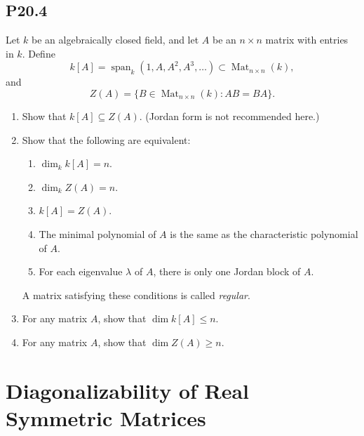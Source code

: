 \documentclass[lang=cn,11pt]{template}
\begin{document}
\subsection*{P20.4} Let \( k \) be an algebraically closed field, and let \( A \) be an \( n \times n \) matrix with entries in \( k \). Define
\[
k[A] = \operatorname{span}_k(1, A, A^2, A^3, \dots) \subset \operatorname{Mat}_{n \times n}(k),
\]
and
\[
Z(A) = \{ B \in \operatorname{Mat}_{n \times n}(k) : AB = BA \}.
\]
\begin{enumerate}
    \item Show that \( k[A] \subseteq Z(A) \). (Jordan form is not recommended here.)
    \item Show that the following are equivalent:
    \begin{enumerate}
        \item \( \dim_k k[A] = n \).
        \item \( \dim_k Z(A) = n \).
        \item \( k[A] = Z(A) \).
        \item The minimal polynomial of \( A \) is the same as the characteristic polynomial of \( A \).
        \item For each eigenvalue \( \lambda \) of \( A \), there is only one Jordan block of \( A \).
    \end{enumerate}
    A matrix satisfying these conditions is called \textit{regular}.
    \item For any matrix \( A \), show that \( \dim k[A] \leq n \).
    \item For any matrix \( A \), show that \( \dim Z(A) \geq n \).
\end{enumerate}

\section{Diagonalizability of Real Symmetric Matrices}
\end{document}
